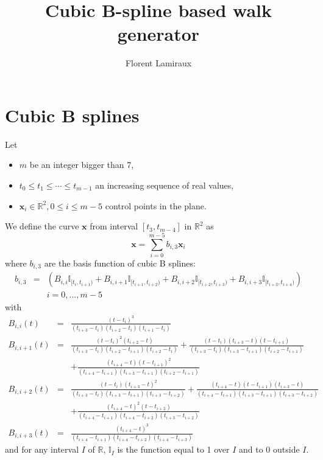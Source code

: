 \documentclass {article}
\title {Cubic B-spline based walk generator}
\author {Florent Lamiraux}
\newcommand\real{\mathbb{R}}
\newcommand\x{\mathbf{x}}
\begin{document}
\maketitle

\section {Cubic B splines}

Let
\begin{itemize}
\item $m$ be an integer bigger than 7,
\item $t_0 \leq t_1 \leq \cdots \leq t_{m-1}$ an increasing sequence
  of real values,
\item $\x_{i} \in \real^2, 0\leq i \leq m-5$ control points in the
  plane.
\end{itemize}
We define the curve $\x$ from interval $[t_3, t_{m-4}]$ in $\real^2$ as
\begin{equation}\label{eq:com-1}
  \x = \sum_{i=0}^{m-5}b_{i,3}\x_i
\end{equation}\label{eq:b-spline}
where $b_{i,3}$ are the basis function of cubic B splines:
\begin{eqnarray*}
b_{i,3} &=& (B_{i, i} \mathbb{I}_{[t_i, t_{i+1})} + B_{i,i+1} \mathbb{I}_{[t_{i+1}, t_{i+2})} +B_{i,i+2} \mathbb{I}_{[t_{i+2}, t_{i+3})}+B_{i,i+3} \mathbb{I}_{[t_{i+3}, t_{i+4})})\\
&&i=0,\ldots, m-5
\end{eqnarray*}
with
\begin{eqnarray*}
B_{i, i} (t) &=& \frac{(t - t_i)^3}{(t_{i+3} - t_i)(t_{i+2} - t_i)(t_{i+1} - t_i)} \\
B_{i,i+1} (t) &=& \frac{(t - t_i)^2(t_{i+2} - t)}{(t_{i+3} - t_i)(t_{i+2} - t_{i+1})(t_{i+2} - t_i)}+\frac{(t - t_i)(t_{i+3} - t)(t - t_{i+1})}{(t_{i+3} - t_i)(t_{i+3} - t_{i+1})(t_{i+2} - t_{i+1})}\\
&&+\frac{(t_{i+4} - t)(t - t_{i+1})^2}{(t_{i+4} - t_{i+1})(t_{i+3} - t_{i+1})(t_{i+2} - t_{i+1})} \\
B_{i,i+2} (t) &=& \frac{(t - t_i)(t_{i+3} - t)^2}{(t_{i+3} - t_i)(t_{i+3} - t_{i+1})(t_{i+3} - t_{i+2})}+\frac{(t_{i+4} - t)(t - t_{i+1})(t_{i+3} - t)}{(t_{i+4} - t_{i+1})(t_{i+3} - t_{i+1})(t_{i+3} - t_{i+2})}\\
&&+\frac{(t_{i+4} - t)^2(t - t_{i+2})}{(t_{i+4} - t_{i+1})(t_{i+4} - t_{i+2})(t_{i+3} - t_{i+2})}\\
B_{i,i+3} (t) &=& \frac{(t_{i+4} - t)^3}{(t_{i+4} - t_{i+1})(t_{i+4} - t_{i+2})(t_{i+4} - t_{i+3})}
\end{eqnarray*}
and for any interval $I$ of $\real$, $\mathbb{I}_{I}$ is the function equal to
1 over $I$ and to $0$ outside $I$.
\end{document}
